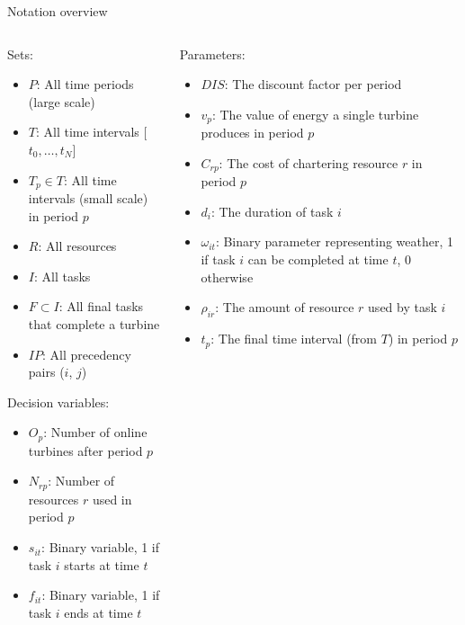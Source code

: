 \documentclass{beamer}
\begin{document}
\begin{frame}{Notation overview}
\scriptsize

\begin{columns}
\begin{column}{.48\textwidth}
Sets:
\begin{itemize}
\item $P$: All time periods (large scale)
\item $T$: All time intervals [$t_0, \dots , t_N$]
\item $T_p \in T$: All time intervals (small scale) in period $p$
\item $R$: All resources
\item $I$: All tasks
\item $F \subset I$: All final tasks that complete a turbine
\item $IP$: All precedency pairs ($i$, $j$)
\end{itemize}

Decision variables:
\begin{itemize}
\item $O_{p}$: Number of online turbines after period $p$
\item $N_{rp}$: Number of resources $r$ used in period $p$
\item $s_{it}$: Binary variable, 1 if task $i$ starts at time $t$
\item $f_{it}$: Binary variable, 1 if task $i$ ends at time $t$
\end{itemize}
\end{column}

\hfill

\begin{column}{.48\textwidth}
Parameters:
\begin{itemize}
\item $DIS$: The discount factor per period
\item $v_p$: The value of energy a single turbine produces in period $p$
\item $C_{rp}$: The cost of chartering resource $r$ in period $p$
\item $d_i$: The duration of task $i$
\item $\omega_{it}$: Binary parameter representing weather, 1 if task $i$ can be completed at time $t$, 0 otherwise
\item $\rho_{ir}$: The amount of resource $r$ used by task $i$
\item $t_p$: The final time interval (from $T$) in period $p$
\end{itemize}
\end{column}
\end{columns}

\end{frame}
\end{document}
